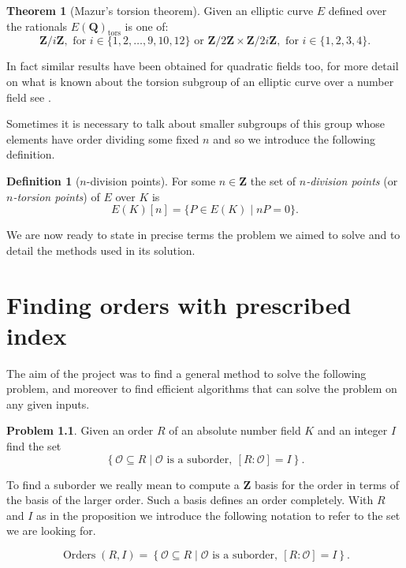 \documentclass[12pt,a4paper,abstracton,bibtotoc]{scrreprt}
\theoremstyle{definition}
\newtheorem{thm}{Theorem}
\newtheorem{defn}{Definition}
\newtheorem{prob}{Problem}
\newcommand{\QQ}{\mathbf{Q}}
\newcommand{\ZZ}{\mathbf{Z}}
\renewcommand{\O}{\mathcal{O}}
\DeclareMathOperator{\Orders}{Orders}
\begin{document}
\begin{thm}[Mazur's torsion theorem]
\label{thm:tors}
Given an elliptic curve $E$ defined over the rationals $E(\QQ)_\text{tors}$ is one of:
\[
\ZZ/i\ZZ,\text{ for } i \in\{1,2,\ldots,9,10,12\}\text{ or }
\ZZ/2\ZZ \times \ZZ/2i\ZZ,\text{ for } i \in\{1,2,3,4\}.
\]
\end{thm}

In fact similar results have been obtained for quadratic fields too, for more detail on what is known about the torsion subgroup of an elliptic curve over a number field see \cite{sutherland}.

Sometimes it is necessary to talk about smaller subgroups of this group whose elements have order dividing some fixed $n$ and so we introduce the following definition.
\begin{defn}[$n$-division points]
For some $n\in\ZZ$ the set of \emph{$n$-division points} (or \emph{$n$-torsion points}) of $E$ over $K$ is
\[
E(K)[n] = \{P\in E(K) \mid nP = 0\}.
\]
\end{defn}

\minisec{}
We are now ready to state in precise terms the problem we aimed to solve and to detail the methods used in its solution.


\chapter{Finding orders with prescribed index}
\label{chap:prob}

The aim of the project was to find a general method to solve the following problem, and moreover to find efficient algorithms that can solve the problem on any given inputs.

\begin{prob}
Given an order $R$ of an absolute number field $K$ and an integer $I$ find the set
\[
\left\{ \O\subseteq R \mid \O\text{ is a suborder},\ [R:\O] = I\right\}.
\]
\end{prob}

To find a suborder we really mean to compute a $\ZZ$ basis for the order in terms of the basis of the larger order.
Such a basis defines an order completely.
With $R$ and $I$ as in the proposition we introduce the following notation to refer to the set we are looking for.

\[
\Orders(R,I) = \left\{ \O\subseteq R \mid \O\text{ is a suborder},\ [R:\O] = I\right\}.
\]
\end{document}
